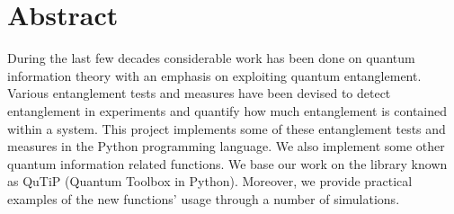 \chapter{Abstract}

During the last few decades considerable work has been done on quantum information theory with an emphasis on exploiting quantum entanglement. Various entanglement tests and measures have been devised to detect entanglement in experiments and quantify how much entanglement is contained within a system. This project implements some of these entanglement tests and measures in the Python programming language. We also implement some other quantum information related functions. We base our work on the library known as QuTiP (Quantum Toolbox in Python). Moreover, we provide practical examples of the new functions' usage through a number of simulations.

